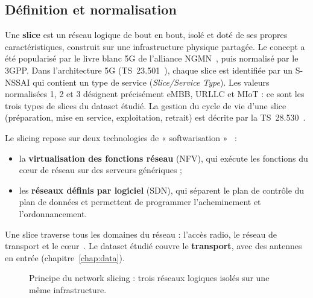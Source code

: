 \subsection{Définition et normalisation}
Une \textbf{slice} est un réseau logique de bout en bout, isolé et doté de ses propres caractéristiques, construit sur une infrastructure physique partagée. Le concept a été popularisé par le livre blanc 5G de l'alliance NGMN~\cite{ngmn}, puis normalisé par le 3GPP. Dans l'architecture 5G (TS~23.501~\cite{ts23501}), chaque slice est identifiée par un S-NSSAI qui contient un type de service (\emph{Slice/Service Type}). Les valeurs normalisées 1, 2 et 3 désignent précisément eMBB, URLLC et MIoT : ce sont les trois types de slices du dataset étudié. La gestion du cycle de vie d'une slice (préparation, mise en service, exploitation, retrait) est décrite par la TS~28.530~\cite{ts28530}.

Le slicing repose sur deux technologies de « softwarisation »~\cite{afolabi,foukas} :
\begin{itemize}
  \item la \textbf{virtualisation des fonctions réseau} (NFV), qui exécute les fonctions du cœur de réseau sur des serveurs génériques ;
  \item les \textbf{réseaux définis par logiciel} (SDN), qui séparent le plan de contrôle du plan de données et permettent de programmer l'acheminement et l'ordonnancement.
\end{itemize}
Une slice traverse tous les domaines du réseau : l'accès radio, le réseau de transport et le cœur~\cite{rost}. Le dataset étudié couvre le \textbf{transport}, avec des antennes en entrée (chapitre~\ref{chap:data}).

\begin{figure}[H]
\centering
{}
\caption{Principe du network slicing : trois réseaux logiques isolés sur une même infrastructure.}
\label{fig:slicing}
\end{figure}

